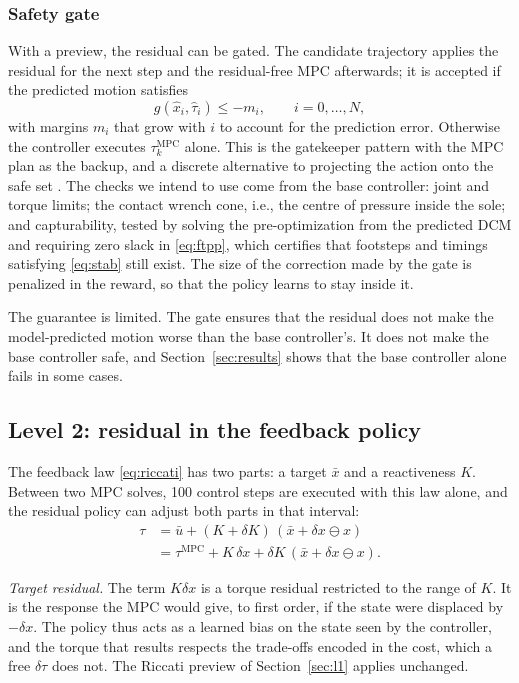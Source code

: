 \documentclass[conference]{IEEEtran}
\newcommand{\mpc}{\mathrm{MPC}}
\newcommand{\xb}{\bar{x}}
\newcommand{\ub}{\bar{u}}
\newcommand{\xh}{\hat{x}}
\begin{document}
\subsubsection{Safety gate}
With a preview, the residual can be gated.
The candidate trajectory applies the residual for the next step and the residual-free MPC afterwards; it is accepted if the predicted motion satisfies
\begin{equation}
g(\xh_i,\hat\tau_i)\le -m_i,\qquad i=0,\dots,N ,
\label{eq:gate}
\end{equation}
with margins $m_i$ that grow with $i$ to account for the prediction error.
Otherwise the controller executes $\tau^{\mpc}_k$ alone.
This is the gatekeeper pattern \cite{agrawal2024gatekeeper} with the MPC plan as the backup, and a discrete alternative to projecting the action onto the safe set \cite{wabersich2021psf}.
The checks we intend to use come from the base controller: joint and torque limits; the contact wrench cone, i.e., the centre of pressure inside the sole; and capturability, tested by solving the pre-optimization from the predicted DCM and requiring zero slack in \eqref{eq:ftpp}, which certifies that footsteps and timings satisfying \eqref{eq:stab} still exist.
The size of the correction made by the gate is penalized in the reward, so that the policy learns to stay inside it.

The guarantee is limited.
The gate ensures that the residual does not make the model-predicted motion worse than the base controller's.
It does not make the base controller safe, and Section~\ref{sec:results} shows that the base controller alone fails in some cases.

\subsection{Level 2: residual in the feedback policy}
\label{sec:l2}
The feedback law \eqref{eq:riccati} has two parts: a target $\xb$ and a reactiveness $K$.
Between two MPC solves, 100 control steps are executed with this law alone, and the residual policy can adjust both parts in that interval:
\begin{align}
\tau&=\ub+(K+\delta K)\,(\xb+\delta x\ominus x)\nonumber\\
&=\tau^{\mpc}+K\,\delta x+\delta K\,(\xb+\delta x\ominus x).
\label{eq:l2}
\end{align}

\emph{Target residual.} The term $K\delta x$ is a torque residual restricted to the range of $K$.
It is the response the MPC would give, to first order, if the state were displaced by $-\delta x$.
The policy thus acts as a learned bias on the state seen by the controller, and the torque that results respects the trade-offs encoded in the cost, which a free $\delta\tau$ does not.
The Riccati preview of Section~\ref{sec:l1} applies unchanged.
\end{document}
